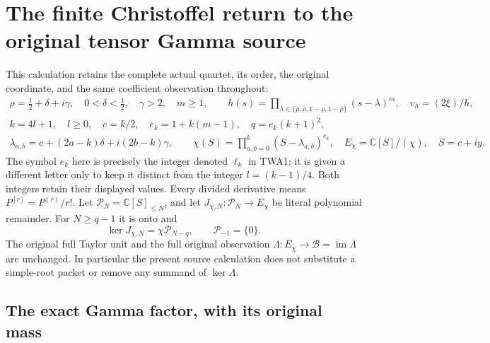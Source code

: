 \section{The finite Christoffel return to the original tensor Gamma source}
\label{sec:gcr-finite-christoffel-return}

This calculation retains the complete actual quartet, its order, the
original coordinate, and the same coefficient observation throughout:
\[
\begin{gathered}
 \rho=\tfrac12+\delta+i\gamma,\quad 0<\delta<\tfrac12,\quad
 \gamma>2,\quad m\geq1,\qquad
 h(s)=\prod_{\lambda\in\{\rho,\bar\rho,1-\rho,1-\bar\rho\}}
                  (s-\lambda)^m,\quad v_h=(2\xi)/h,\\
 k=4l+1,\quad l\geq0,\quad c=k/2,\quad
 e_k=1+k(m-1),\quad q=e_k(k+1)^2,\\
 \lambda_{a,b}=c+(2a-k)\delta+i(2b-k)\gamma,\qquad
 \chi(S)=\prod_{a,b=0}^k(S-\lambda_{a,b})^{e_k},
 \quad E_\chi=\mathbb C[S]/(\chi),\quad S=c+iy.
\end{gathered}\tag{GCR1}
\]
The symbol $e_k$ here is precisely the integer denoted $\ell_k$ in
TWA1; it is given a different letter only to keep it distinct from
the integer $l=(k-1)/4$. Both integers retain their displayed values.
Every divided derivative means $P^{[r]}=P^{(r)}/r!$.
Let $\mathcal P_N=\mathbb C[S]_{\leq N}$, and let
$J_{\chi,N}:\mathcal P_N\to E_\chi$ be literal polynomial remainder.
For $N\geq q-1$ it is onto and
\[
 \ker J_{\chi,N}=\chi\mathcal P_{N-q},\qquad
 \mathcal P_{-1}=\{0\}.
\tag{GCR2}
\]
The original full Taylor unit and the full original observation
$\Lambda:E_\chi\to\mathcal B=\operatorname{im}\Lambda$ are unchanged.
In particular the present source calculation does not substitute a
simple-root packet or remove any summand of $\ker\Lambda$.

\subsection{The exact Gamma factor, with its original mass}

